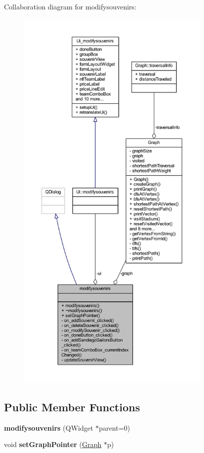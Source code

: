 Collaboration diagram for modifysouvenirs\+:\nopagebreak
\begin{figure}[H]
\begin{center}
\leavevmode
\includegraphics[height=550pt]{classmodifysouvenirs__coll__graph}
\end{center}
\end{figure}
\subsection*{Public Member Functions}
\begin{DoxyCompactItemize}
\item 
\mbox{\label{classmodifysouvenirs_ae8cf83ce05a01274522a341a8e081928}} 
{\bfseries modifysouvenirs} (Q\+Widget $\ast$parent=0)
\item 
\mbox{\label{classmodifysouvenirs_ad15ff72e8ed3361501972a0927f687ab}} 
void {\bfseries set\+Graph\+Pointer} (\hyperlink{class_graph}{Graph} $\ast$p)
\end{DoxyCompactItemize}
